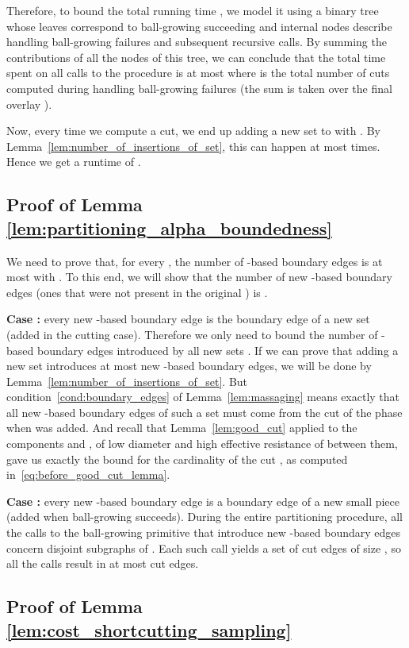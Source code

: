 \documentclass[11pt, letterpaper]{article}
\begin{document}
Therefore, to bound the total running time , we model it using a binary tree whose leaves correspond to ball-growing succeeding and internal nodes describe handling ball-growing failures and subsequent recursive calls. By summing the contributions of all the nodes of this tree, we can conclude that the total time spent on all calls to the  procedure is at most
 where  is the total number of cuts computed during handling ball-growing failures (the sum is taken over the final overlay ).

Now, every time we compute a cut, we end up adding a new set to  with . By Lemma~\ref{lem:number_of_insertions_of_set}, this can happen at most  times. Hence we get a runtime of .

\subsection{Proof of Lemma \ref{lem:partitioning_alpha_boundedness}} \label{app:partitioning_alpha_boundedness}

We need to prove that, for every , the number of -based boundary edges is at most  with . To this end, we will show that the number of new -based boundary edges (ones that were not present in the original ) is .

\textbf{Case :} every new -based boundary edge is the boundary edge of a new set  (added in the cutting case). Therefore we only need to bound the number of -based boundary edges introduced by all new sets . If we can prove that adding a new set  introduces at most  new -based boundary edges, we will be done by Lemma~\ref{lem:number_of_insertions_of_set}. But condition~\eqref{cond:boundary_edges} of Lemma~\ref{lem:massaging} means exactly that all new -based boundary edges of such a set  must come from the cut  of the phase when  was added. And recall that Lemma~\ref{lem:good_cut} applied to the components  and , of low diameter  and high effective resistance of  between them, gave us exactly the bound  for the cardinality of the cut , as computed in~\eqref{eq:before_good_cut_lemma}.

\textbf{Case :} every new -based boundary edge is a boundary edge of a new small piece (added when ball-growing succeeds). During the entire partitioning procedure, all the calls to the ball-growing primitive that introduce new -based boundary edges concern disjoint subgraphs  of . Each such call yields a set of cut edges of size , so all the calls result in at most  cut edges.


\subsection{Proof of Lemma \ref{lem:cost_shortcutting_sampling}}\label{app:cost_shortcutting_sampling}
\end{document}
